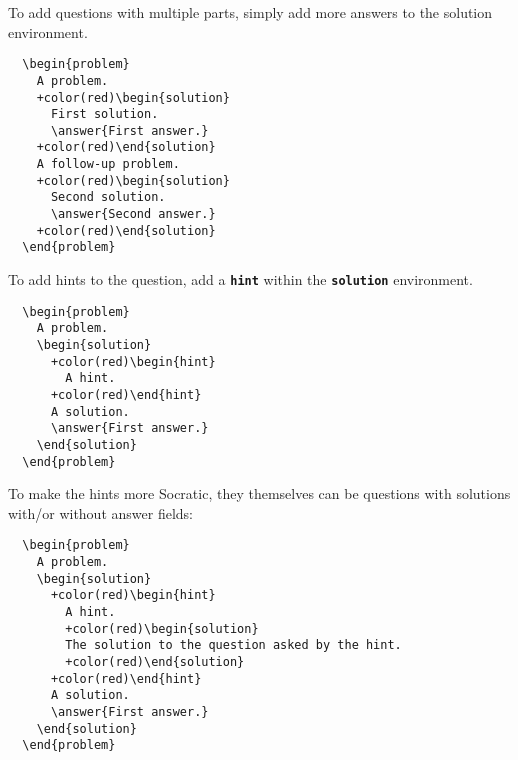 \documentclass{amsart}
\newcommand\code[1]{{\bfseries\texttt{#1}}}
\begin{document}
To add questions with multiple parts, simply add more answers to the
solution environment.

\begin{Verbatim}
  \begin{problem}
    A problem. 
    +color(red)\begin{solution}
      First solution. 
      \answer{First answer.}
    +color(red)\end{solution}
    A follow-up problem.
    +color(red)\begin{solution}
      Second solution. 
      \answer{Second answer.}
    +color(red)\end{solution}
  \end{problem}
\end{Verbatim}


To add hints to the question, add a \code{hint} within the
\code{solution} environment.



\begin{Verbatim}
  \begin{problem}
    A problem. 
    \begin{solution}
      +color(red)\begin{hint}
        A hint.
      +color(red)\end{hint}
      A solution. 
      \answer{First answer.}
    \end{solution}
  \end{problem}
\end{Verbatim}

To make the hints more Socratic, they themselves can be questions
with solutions with/or without answer fields:

\begin{Verbatim}
  \begin{problem}
    A problem. 
    \begin{solution}
      +color(red)\begin{hint}
        A hint.
        +color(red)\begin{solution}
        The solution to the question asked by the hint.
        +color(red)\end{solution}
      +color(red)\end{hint}
      A solution. 
      \answer{First answer.}
    \end{solution}
  \end{problem}
\end{Verbatim}
\end{document}
